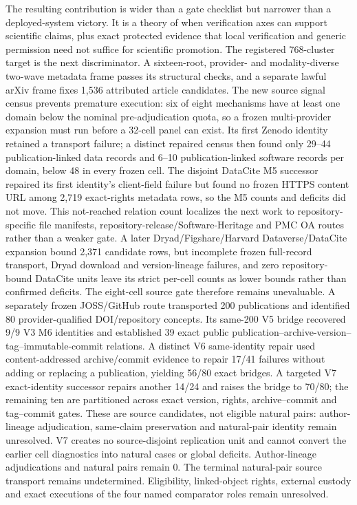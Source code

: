 The resulting contribution is wider than a gate checklist but narrower than a
deployed-system victory.  It is a theory of when verification axes can support
scientific claims, plus exact protected evidence that local verification and
generic permission need not suffice for scientific promotion.  The registered
768-cluster target is the next discriminator. A sixteen-root, provider- and
modality-diverse two-wave metadata frame passes its structural checks, and a
separate lawful arXiv frame fixes 1,536 attributed article candidates.  The
new source signal census prevents premature execution: six of eight mechanisms
have at least one domain below the nominal pre-adjudication quota, so a frozen
multi-provider expansion must run before a 32-cell panel can exist.  Its first
Zenodo identity retained a transport failure; a distinct repaired census then
found only 29--44 publication-linked data records and 6--10
publication-linked software records per domain, below 48 in every frozen cell.
The disjoint DataCite M5 successor repaired its first identity's client-field
failure but found no frozen HTTPS content URL among 2,719 exact-rights metadata
rows, so the M5 counts and deficits did not move. This not-reached relation
count localizes the next work to repository-specific file manifests,
repository-release/Software-Heritage and PMC OA routes rather than a weaker
gate. A later Dryad/Figshare/Harvard Dataverse/DataCite expansion bound 2,371
candidate rows, but incomplete frozen full-record transport, Dryad download and
version-lineage failures, and zero repository-bound DataCite units leave its
strict per-cell counts as lower bounds rather than confirmed deficits. The
eight-cell source gate therefore remains unevaluable. A separately frozen
JOSS/GitHub route transported 200 publications and identified 80
provider-qualified DOI/repository concepts. Its same-200 V5 bridge recovered
9/9 V3 M6 identities and established 39 exact public
publication--archive-version--tag--immutable-commit relations. A distinct V6
same-identity repair used content-addressed archive/commit evidence to repair
17/41 failures without adding or replacing a publication, yielding 56/80 exact
bridges. A targeted V7 exact-identity successor repairs another 14/24 and raises
the bridge to 70/80; the remaining ten are partitioned across exact version,
rights, archive--commit and tag--commit gates. These are source candidates, not
eligible natural pairs: author-lineage adjudication, same-claim preservation
and natural-pair identity remain unresolved. V7 creates no source-disjoint
replication unit and cannot convert the earlier cell diagnostics into natural
cases or global deficits. Author-lineage
adjudications and natural pairs remain 0. The terminal
natural-pair source transport remains undetermined. Eligibility,
linked-object rights, external custody and exact executions of the four named
comparator roles remain unresolved.

